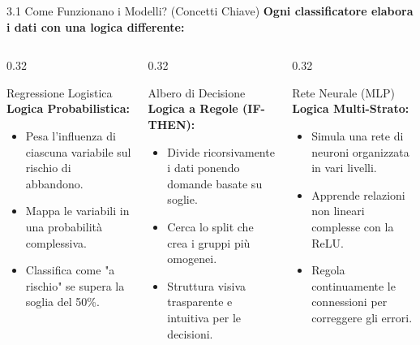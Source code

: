 \documentclass[aspectratio=169,xcolor=table]{beamer}
\begin{document}
\begin{frame}{3.1 Come Funzionano i Modelli? (Concetti Chiave)}
  \textbf{Ogni classificatore elabora i dati con una logica differente:}
  \vspace{0.2cm}
  
  \begin{columns}[t]
    \begin{column}{0.32\textwidth}
      \begin{block}{Regressione Logistica}
        \scriptsize
        \textbf{Logica Probabilistica:}\\
        \begin{itemize}
          \item Pesa l'influenza di ciascuna variabile sul rischio di abbandono.
          \item Mappa le variabili in una probabilità complessiva.
          \item Classifica come "a rischio" se supera la soglia del 50\%.
        \end{itemize}
      \end{block}
    \end{column}
    
    \begin{column}{0.32\textwidth}
      \begin{block}{Albero di Decisione}
        \scriptsize
        \textbf{Logica a Regole (IF-THEN):}\\
        \begin{itemize}
          \item Divide ricorsivamente i dati ponendo domande basate su soglie.
          \item Cerca lo split che crea i gruppi più omogenei.
          \item Struttura visiva trasparente e intuitiva per le decisioni.
        \end{itemize}
      \end{block}
    \end{column}
    
    \begin{column}{0.32\textwidth}
      \begin{block}{Rete Neurale (MLP)}
        \scriptsize
        \textbf{Logica Multi-Strato:}\\
        \begin{itemize}
          \item Simula una rete di neuroni organizzata in vari livelli.
          \item Apprende relazioni non lineari complesse con la ReLU.
          \item Regola continuamente le connessioni per correggere gli errori.
        \end{itemize}
      \end{block}
    \end{column}
  \end{columns}
\end{frame}
\end{document}
